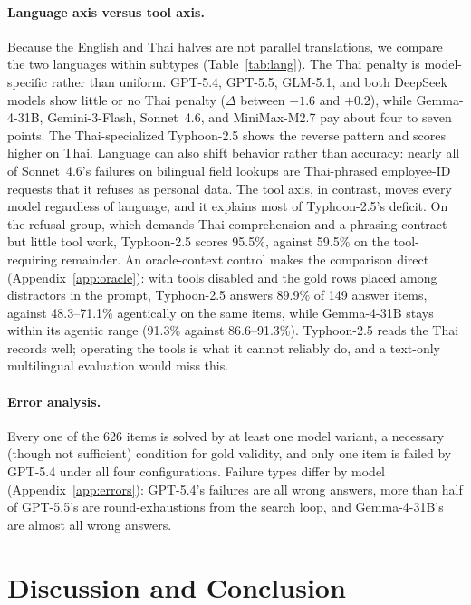 \documentclass[11pt]{article}
\begin{document}
\paragraph{Language axis versus tool axis.} Because the English and Thai halves are not parallel
translations, we compare the two languages within subtypes (Table~\ref{tab:lang}). The Thai penalty is
model-specific rather than uniform. GPT-5.4, GPT-5.5, GLM-5.1, and both DeepSeek models show little or no
Thai penalty ($\Delta$ between $-1.6$ and $+0.2$), while Gemma-4-31B, Gemini-3-Flash, Sonnet~4.6, and
MiniMax-M2.7 pay about four to seven points. The Thai-specialized Typhoon-2.5 shows the reverse pattern and scores higher on Thai.
Language can also shift behavior rather than accuracy: nearly all of Sonnet~4.6's failures on bilingual field
lookups are Thai-phrased employee-ID requests that it refuses as personal data. The tool axis, in
contrast, moves every model regardless of language, and it explains most of Typhoon-2.5's deficit. On the
refusal group, which demands Thai comprehension and a phrasing contract but little tool work, Typhoon-2.5
scores 95.5\%, against 59.5\% on the tool-requiring remainder. An oracle-context control makes the
comparison direct (Appendix~\ref{app:oracle}): with tools disabled and the gold rows placed among
distractors in the prompt, Typhoon-2.5 answers 89.9\% of 149 answer items, against 48.3--71.1\%
agentically on the same items, while Gemma-4-31B stays within its agentic range (91.3\% against
86.6--91.3\%). Typhoon-2.5 reads the Thai records well; operating the tools is what it cannot reliably do,
and a text-only multilingual evaluation would miss this.

\paragraph{Error analysis.} Every one of the 626 items is solved by at least one model variant, a
necessary (though not sufficient) condition for gold validity, and only one item is failed by GPT-5.4
under all four configurations. Failure types differ by model (Appendix~\ref{app:errors}): GPT-5.4's
failures are all wrong answers, more than half of GPT-5.5's are round-exhaustions from the search loop, and
Gemma-4-31B's are almost all wrong answers.

\section{Discussion and Conclusion}
\end{document}
